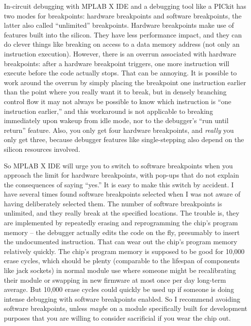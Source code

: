 In-circuit debugging with MPLAB X IDE and a debugging tool like a PICkit has
two modes for breakpoints: hardware breakpoints and software breakpoints,
the latter also called ``unlimited'' breakpoints.  Hardware breakpoints make
use of features built into the silicon.  They have less performance impact,
and they can do clever things like breaking on access to a data memory
address (not only an instruction execution).  However, there is an overrun
associated with hardware breakpoints: after a hardware breakpoint triggers,
one more instruction will execute before the code actually stops.  That can
be annoying.  It is possible to work around the overrun by simply placing
the breakpoint one instruction earlier than the point where you really want
it to break, but in densely branching control flow it may not always be
possible to know which instruction is ``one instruction earlier,'' and this
workaround is not applicable to breaking immediately upon wakeup from idle
mode, nor to the debugger's ``run until return'' feature.  Also, you only
get four hardware breakpoints, and \emph{really} you only get three, because
debugger features like single-stepping also depend on the silicon resources
involved.

So MPLAB X IDE will urge you to switch to software breakpoints when you
approach the limit for hardware breakpoints, with pop-ups that do not
explain the consequences of saying ``yes.'' It is easy to make this switch
by accident.  I have several times found software breakpoints selected when
I was not aware of having deliberately selected them.  The number of
software breakpoints is unlimited, and they really break at the specified
locations.  The trouble is, they are implemented by repeatedly erasing and
reprogramming the chip's program memory -- the debugger actually edits the
code on the fly, presumably to insert the undocumented 
instruction.  That can wear out the chip's program memory relatively
quickly.  The chip's program memory is supposed to be good for 10,000 erase
cycles, which should be plenty (comparable to the lifespan of components
like jack sockets) in normal module use where someone might be recalibrating
their module or swapping in new firmware at most once per day long-term
average.  But 10,000 erase cycles could quickly be used up if someone is
doing intense debugging with software breakpoints enabled.  So I recommend
avoiding software breakpoints, unless \emph{maybe} on a module specifically
built for development purposes that you are willing to consider sacrificial
if you wear the chip out.

